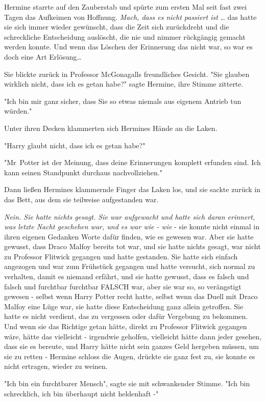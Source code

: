 {Hermine starrte auf den Zauberstab und spürte zum ersten Mal seit fast zwei Tagen das Aufkeimen von Hoffnung. \emph{Mach, dass es nicht passiert ist} … das hatte sie sich immer wieder gewünscht, dass die Zeit sich zurückdreht und die schreckliche Entscheidung auslöscht, die nie und nimmer rückgängig gemacht werden konnte. Und wenn das Löschen der Erinnerung das nicht war, so war es doch eine Art Erlösung…

Sie blickte zurück in Professor McGonagalls freundliches Gesicht. "Sie glauben wirklich nicht, dass ich es getan habe?" sagte Hermine, ihre Stimme zitterte.

"Ich bin mir ganz sicher, dass Sie so etwas niemals aus eigenem Antrieb tun würden."

Unter ihren Decken klammerten sich Hermines Hände an die Laken.

"Harry glaubt nicht, dass ich es getan habe?"

"Mr~Potter ist der Meinung, dass deine Erinnerungen komplett erfunden sind. Ich kann seinen Standpunkt durchaus nachvollziehen."

Dann ließen Hermines klammernde Finger das Laken los, und sie sackte zurück in das Bett, aus dem sie teilweise aufgestanden war.

\emph{Nein. Sie hatte nichts gesagt. Sie war aufgewacht und hatte sich daran erinnert, was letzte Nacht geschehen war, und es war wie - wie} - sie konnte nicht einmal in ihren eigenen Gedanken Worte dafür finden, wie es gewesen war. Aber sie hatte gewusst, dass Draco Malfoy bereits tot war, und sie hatte nichts gesagt, war nicht zu Professor Flitwick gegangen und hatte gestanden. Sie hatte sich einfach angezogen und war zum Frühstück gegangen und hatte versucht, sich normal zu verhalten, damit es niemand erfährt, und sie hatte gewusst, dass es falsch und falsch und furchtbar furchtbar FALSCH war, aber sie war so, so verängstigt gewesen - selbst wenn Harry Potter recht hatte, selbst wenn das Duell mit Draco Malfoy eine Lüge war, sie hatte diese Entscheidung ganz allein getroffen. Sie hatte es nicht verdient, das zu vergessen oder dafür Vergebung zu bekommen. Und wenn sie das Richtige getan hätte, direkt zu Professor Flitwick gegangen wäre, hätte das vielleicht - irgendwie geholfen, vielleicht hätte dann jeder gesehen, dass sie es bereute, und Harry hätte nicht sein ganzes Geld hergeben müssen, um sie zu retten - Hermine schloss die Augen, drückte sie ganz fest zu, sie konnte es nicht ertragen, wieder zu weinen.

"Ich bin ein furchtbarer Mensch", sagte sie mit schwankender Stimme. "Ich bin schrecklich, ich bin überhaupt nicht heldenhaft -"

}
